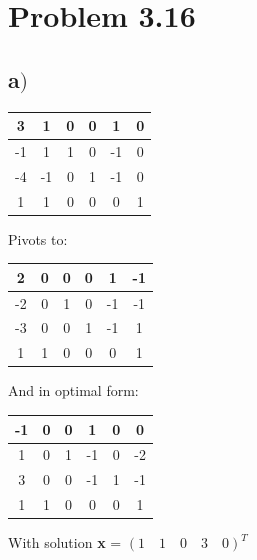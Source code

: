 \documentclass[a4paper,12pt]{article}
\begin{document}
\section*{Problem 3.16}
\subsection*{a\()\)}
\begin{center}
\begin{tabular}{| c | c  c  c  c  c |}
\hline
3 & 1 & 0 & 0 & 1 & 0\\
\hline
-1 & 1 & 1 & 0 & -1 & 0\\
-4 & -1 & 0 & 1 & -1 & 0\\
1 & 1 & 0 & 0 & 0 & 1\\
\hline
\end{tabular}
\end{center}
Pivots to:
\begin{center}
\begin{tabular}{| c | c  c  c  c  c |}
\hline
2 & 0 & 0 & 0 & 1 & -1\\
\hline
-2 & 0 & 1 & 0 & -1 & -1\\
-3 & 0 & 0 & 1 & -1 & 1\\
1 & 1 & 0 & 0 & 0 & 1\\
\hline
\end{tabular}
\end{center}
And in optimal form:
\begin{center}
\begin{tabular}{| c | c  c  c  c  c |}
\hline
-1 & 0 & 0 & 1 & 0 & 0\\
\hline
1 & 0 & 1 & -1 & 0 & -2\\
3 & 0 & 0 & -1 & 1 & -1\\
1 & 1 & 0 & 0 & 0 & 1\\
\hline
\end{tabular}
\end{center}
With solution {\bf x} = \( (1 \quad 1 \quad 0 \quad 3 \quad 0)^T \)
\end{document}
